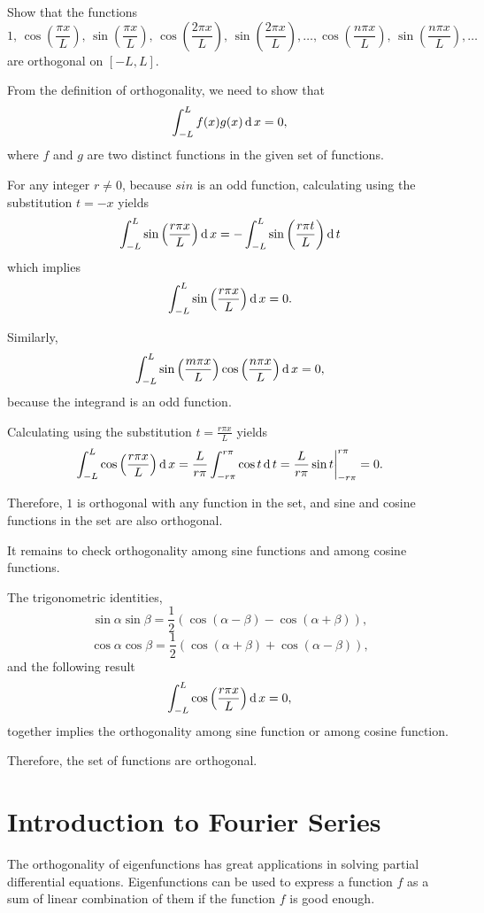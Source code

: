 \begin{exercise}
  Show that the functions
\[1,\, \cos\left(\frac{\pi x}{L}\right),\, \sin\left(\frac{\pi x}{L}\right), \, \cos\left(\frac{2\pi x}{L}\right), \, \sin\left(\frac{2\pi x}{L}\right),\dots, \cos\left(\frac{n\pi x}{L}\right), \, \sin\left(\frac{n\pi x}{L}\right),\dots\]
are orthogonal on $[-L,L]$.
\end{exercise}
\begin{exersol}
  From the definition of orthogonality, we need to show that
  \[
  \int_{-L}^L f(x)g(x)\operatorname{d} x=0,  
  \]
  where $f$ and $g$ are two distinct functions in the given set of functions.

  For any integer $r\neq 0$, because $sin$ is an odd function, calculating using the substitution $t=-x$ yields
  \[
    \int_{-L}^L\sin\left(\frac{r\pi x}{L}\right)\operatorname{d} x=-\int_{-L}^L\sin\left(\frac{r\pi t}{L}\right)\operatorname{d} t
  \]
  which implies
  \[\int_{-L}^L\sin\left(\frac{r\pi x}{L}\right)\operatorname{d} x=0.\]

  Similarly,
  \[
    \int_{-L}^L\sin\left(\frac{m\pi x}{L}\right)\cos\left(\frac{n\pi x}{L}\right)\operatorname{d} x=0,
  \]
because the integrand is an odd function.

  Calculating using the substitution $t=\frac{r\pi x}{L}$ yields
  \[
    \int_{-L}^L\cos\left(\frac{r\pi x}{L}\right)\operatorname{d} x=\frac{L}{r\pi}
    \int_{-r\pi}^{r\pi}\cos t\operatorname{d} t=\frac{L}{r\pi}\sin t\bigg|_{-r\pi}^{r\pi}=0.
  \]

 Therefore, $1$ is orthogonal with any function in the set, and sine and cosine functions in the set are also orthogonal.

 It remains to check orthogonality among sine functions and among cosine functions.

 The trigonometric identities,
 \[
 \sin\alpha\sin\beta=\frac12(\cos(\alpha-\beta)-\cos(\alpha+\beta)), 
 \]
 \[
 \cos\alpha\cos\beta=\frac12(\cos(\alpha+\beta)+\cos(\alpha-\beta)), 
 \]
 and the following result
 \[
  \int_{-L}^L\cos\left(\frac{r\pi x}{L}\right)\operatorname{d} x=0,
 \]
 together implies the orthogonality among sine function or among cosine function.

 Therefore, the set of functions are orthogonal.
\end{exersol}

\section{Introduction to Fourier Series}

The orthogonality of eigenfunctions has great applications in solving partial differential equations. Eigenfunctions can be used to express a function $f$ as a sum of linear combination of them if the function $f$ is good enough.

